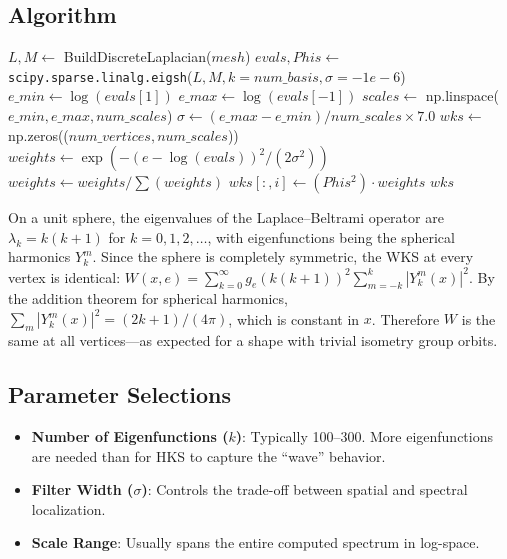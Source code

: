 \subsection{Algorithm}
\begin{algorithm}
\caption{Wave Kernel Signature\label{alg:compute_wks}}
\begin{algorithmic}[1]
  \State $L, M \gets$ BuildDiscreteLaplacian($mesh$)
  \State $evals, Phis \gets$ \texttt{scipy.sparse.linalg.eigsh}($L, M, k{=}num\_basis, \sigma{=}{-}1e{-}6$)
  \State $e\_min \gets \log(evals[1])$ 
  \State $e\_max \gets \log(evals[-1])$
  \State $scales \gets$ np.linspace($e\_min, e\_max, num\_scales$)
  \State $\sigma \gets (e\_max - e\_min) / num\_scales \times 7.0$ 
  \State $wks \gets$ np.zeros(($num\_vertices, num\_scales$))
    \State $weights \gets \exp(-(e - \log(evals))^2 / (2\sigma^2))$
    \State $weights \gets weights / \sum(weights)$
    \State $wks[:, i] \gets (Phis^2) \cdot weights$
  \EndFor
  \State \Return $wks$
\EndFunction
\end{algorithmic}
\end{algorithm}

\begin{example}\label{example:wks_sphere}
On a unit sphere, the eigenvalues of the Laplace--Beltrami operator are $\lambda_k = k(k+1)$ for $k = 0, 1, 2, \ldots$, with eigenfunctions being the spherical harmonics $Y_k^m$. Since the sphere is completely symmetric, the WKS at every vertex is identical: $W(x, e) = \sum_{k=0}^{\infty} g_e(k(k+1))^2 \sum_{m=-k}^{k} |Y_k^m(x)|^2$. By the addition theorem for spherical harmonics, $\sum_m |Y_k^m(x)|^2 = (2k+1)/(4\pi)$, which is constant in $x$. Therefore $W$ is the same at all vertices---as expected for a shape with trivial isometry group orbits.
\end{example}

\subsection{Parameter Selections}
\begin{itemize}
  \item \textbf{Number of Eigenfunctions ($k$)}: Typically 100--300. More eigenfunctions are needed than for HKS to capture the ``wave'' behavior.
  \item \textbf{Filter Width ($\sigma$)}: Controls the trade-off between spatial and spectral localization.
  \item \textbf{Scale Range}: Usually spans the entire computed spectrum in log-space.
\end{itemize}

